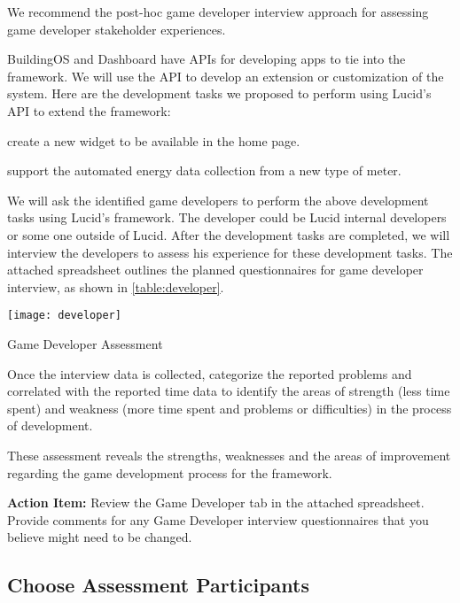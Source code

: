 We recommend the post-hoc game developer interview approach for assessing game developer stakeholder experiences.

BuildingOS and Dashboard have APIs for developing apps to tie into the framework. We will use the API to develop an extension or customization of the system. Here are the development tasks we proposed to perform using Lucid's API to extend the framework:
\begin{compactenum}
  \item create a new widget to be available in the home page.
  \item support the automated energy data collection from a new type of meter.
\end{compactenum}

We will ask the identified game developers to perform the above development tasks using Lucid's framework. The developer could be Lucid internal developers or some one outside of Lucid.  After the development tasks are completed, we will interview the developers to assess his experience for these development tasks.
The attached spreadsheet outlines the planned questionnaires for game developer interview, as shown in \autoref{table:developer}.

\begin{table}[ht!]
  \center
  \texttt{[image: developer]}
  \caption{Game Developer Assessment}
  \label{table:developer}
\end{table}

Once the interview data is collected, categorize the reported problems and correlated with the reported time data to identify the areas of strength (less time spent) and weakness (more time spent and problems or difficulties) in the process of development. 

These assessment reveals the strengths, weaknesses and the areas of improvement regarding the game development process for the framework.

\begin{shadebox}
{\bf Action Item:} Review the Game Developer tab in the attached
spreadsheet.  Provide comments for any Game Developer interview questionnaires that
you believe might need to be changed. 
\end{shadebox}

\subsection{Choose Assessment Participants}

